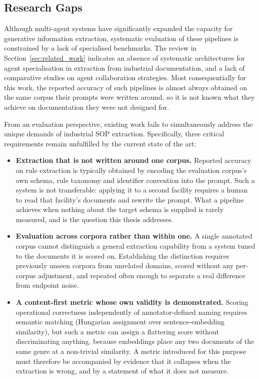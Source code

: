 \documentclass[11pt]{article}
\begin{document}
\subsection{Research Gaps}
Although multi-agent systems have significantly expanded the capacity for generative information extraction, systematic evaluation of these pipelines is constrained by a lack of specialised benchmarks. The review in Section~\ref{sec:related_work} indicates an absence of systematic architectures for agent specialisation in extraction from industrial documentation, and a lack of comparative studies on agent collaboration strategies. Most consequentially for this work, the reported accuracy of such pipelines is almost always obtained on the same corpus their prompts were written around, so it is not known what they achieve on documentation they were not designed for.

From an evaluation perspective, existing work fails to simultaneously address the unique demands of industrial SOP extraction. Specifically, three critical requirements remain unfulfilled by the current state of the art:
\begin{itemize}
    \item \textbf{Extraction that is not written around one corpus.} Reported accuracy on rule extraction is typically obtained by encoding the evaluation corpus's own schema, rule taxonomy and identifier convention into the prompt. Such a system is not transferable: applying it to a second facility requires a human to read that facility's documents and rewrite the prompt. What a pipeline achieves when nothing about the target schema is supplied is rarely measured, and is the question this thesis addresses.
    \item \textbf{Evaluation across corpora rather than within one.} A single annotated corpus cannot distinguish a general extraction capability from a system tuned to the documents it is scored on. Establishing the distinction requires previously unseen corpora from unrelated domains, scored without any per-corpus adjustment, and repeated often enough to separate a real difference from endpoint noise.
    \item \textbf{A content-first metric whose own validity is demonstrated.} Scoring operational correctness independently of annotator-defined naming requires semantic matching (Hungarian assignment over sentence-embedding similarity), but such a metric can assign a flattering score without discriminating anything, because embeddings place any two documents of the same genre at a non-trivial similarity. A metric introduced for this purpose must therefore be accompanied by evidence that it collapses when the extraction is wrong, and by a statement of what it does not measure.
\end{itemize}
\end{document}
